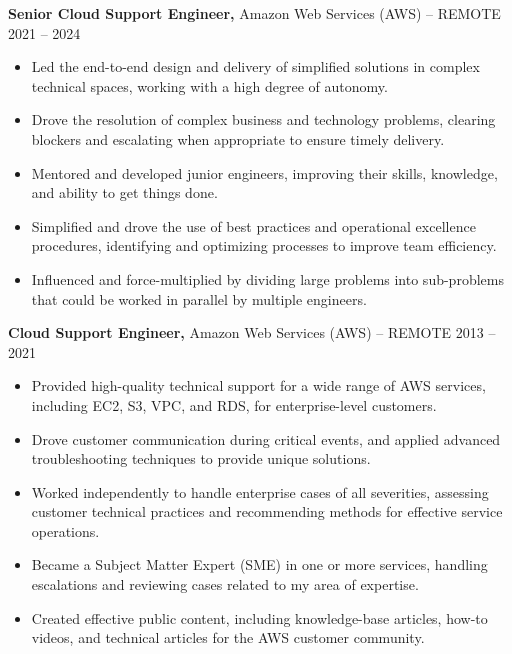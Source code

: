 \documentclass[11pt]{article}
\begin{document}
{\large\textbf{Senior Cloud Support Engineer,}} {Amazon Web Services (AWS)} -- REMOTE \hfill 2021 -- 2024 \\
\vspace{-9pt}
\begin{itemize}
    \item Led the end-to-end design and delivery of simplified solutions in complex technical spaces, working with a high degree of autonomy.
    \item Drove the resolution of complex business and technology problems, clearing blockers and escalating when appropriate to ensure timely delivery.
    \item Mentored and developed junior engineers, improving their skills, knowledge, and ability to get things done.
    \item Simplified and drove the use of best practices and operational excellence procedures, identifying and optimizing processes to improve team efficiency.
    \item Influenced and force-multiplied by dividing large problems into sub-problems that could be worked in parallel by multiple engineers.
\end{itemize}

{\large\textbf{Cloud Support Engineer,}} {Amazon Web Services (AWS)} -- REMOTE \hfill 2013 -- 2021 \\
\vspace{-9pt}
\begin{itemize}
    \item Provided high-quality technical support for a wide range of AWS services, including EC2, S3, VPC, and RDS, for enterprise-level customers.
    \item Drove customer communication during critical events, and applied advanced troubleshooting techniques to provide unique solutions.
    \item Worked independently to handle enterprise cases of all severities, assessing customer technical practices and recommending methods for effective service operations.
    \item Became a Subject Matter Expert (SME) in one or more services, handling escalations and reviewing cases related to my area of expertise.
    \item Created effective public content, including knowledge-base articles, how-to videos, and technical articles for the AWS customer community.
\end{itemize}
\end{document}
